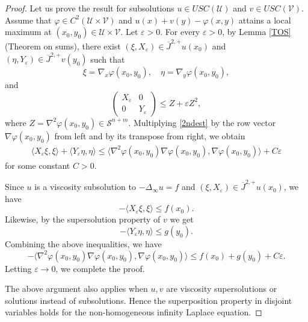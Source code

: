 \documentclass[12pt, reqno]{amsart}
\newcommand{\R}{\mathbb{R}}
\newcommand{\Jop}{\overline{J}^{2,+}}
\def\R{{\mathbb R}}
\def\S{{\mathcal S}}
\def\U{{\mathcal U}}
\def\V{{\mathcal V}}
\DeclareMathOperator{\tr}{tr}
\begin{document}
\begin{proof}
    Let us prove the result for subsolutions $u\in USC(\U)$ and $v\in USC(\V)$. Assume that $\varphi\in C^2(\U\times \V)$ and $u(x)+v(y)-\varphi(x,y)$ attains a local maximum at $(x_0,y_0)\in \U\times \V$. Let $\varepsilon>0$. For every $\varepsilon>0$, by Lemma \ref{TOS} (Theorem on sums), there exist $(\xi, X_\varepsilon)\in \overline{J}^{2,+}u(x_0)$ and $(\eta, Y_\varepsilon)\in \overline{J}^{2,+}v(y_0)$ such that \[
    \xi=\nabla_x \varphi(x_0,y_0),\quad\eta=\nabla_y \varphi(x_0,y_0),
    \]and %
    \begin{equation}\label{2ndest}  
 \begin{pmatrix}
X_\varepsilon & 0 \\
0 & Y_\varepsilon
\end{pmatrix}\le Z+\varepsilon Z^2,
\end{equation}
where $Z=\nabla^2 \varphi(x_0, y_0)\in \S^{n+m}$.
  Multiplying \eqref{2ndest} by the row vector $\nabla \varphi(x_0,y_0)$ from left and by its transpose from right, we obtain
    \[
    \begin{aligned}
    \langle X_\varepsilon \xi, \xi\rangle+\langle Y_\varepsilon \eta, \eta\rangle \le 
       \langle \nabla^2 \varphi(x_0,y_0)\nabla \varphi(x_0,y_0), \nabla \varphi(x_0,y_0)\rangle+C\varepsilon 
    \end{aligned}
    \]
     for some constant $C>0.$ 
     
     Since $u$ is a viscosity subsolution to $-\Delta_\infty u=f$ and $(\xi, X_\varepsilon)\in \Jop u(x_0)$, we have
     \[
    - \langle X_\varepsilon \xi, \xi\rangle\le f(x_0). 
     \]
Likewise, by the supersolution property of $v$ we get
\[
    - \langle Y_\varepsilon \eta, \eta\rangle\le g(y_0).
     \]
Combining the above inequalities, we have 
\[
-\langle \nabla^2 \varphi(x_0,y_0)\nabla \varphi(x_0,y_0), \nabla \varphi(x_0,y_0)\rangle\le f(x_0)+g(y_0)+C\varepsilon.
\]
Letting $\varepsilon\to 0$, we complete the proof. 

The above argument also applies when $u,v$ are viscosity supersolutions or solutions instead of subsolutions. Hence the superposition property in disjoint variables holds for the non-homogeneous infinity Laplace equation.
    \end{proof}
\end{document}
